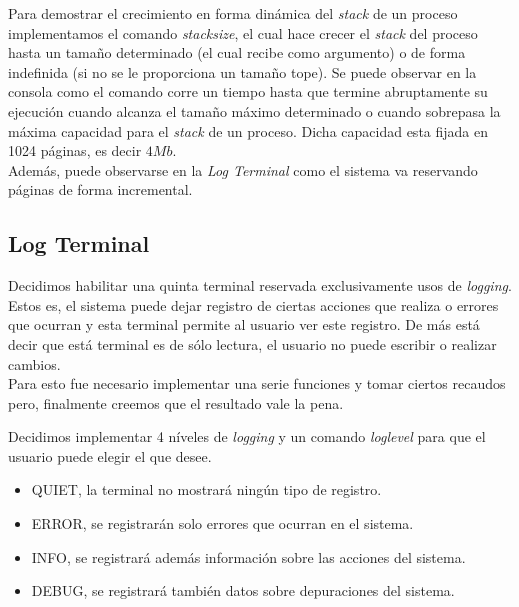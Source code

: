 \documentclass[a4paper,10pt]{article}
\begin{document}
        Para demostrar el crecimiento en forma dinámica del \textit{stack} de un proceso implementamos el comando \textit{stacksize}, el cual hace crecer el 
        \textit{stack} del proceso hasta un tamaño determinado (el cual recibe como argumento) o de forma indefinida (si no se le proporciona un tamaño tope).
        Se puede observar en la consola como el comando corre un tiempo hasta que termine abruptamente su ejecución cuando alcanza el tamaño máximo determinado 
        o cuando sobrepasa la máxima capacidad para el \textit{stack} de un proceso. Dicha capacidad esta fijada en 1024 páginas, es decir $4 Mb$.\\

        Además, puede observarse en la \textit{Log Terminal} como el sistema va reservando páginas de forma incremental.

        \subsection{Log Terminal}

        Decidimos habilitar una quinta terminal reservada exclusivamente usos de \textit{logging}. 
        Estos es, el sistema puede dejar registro de ciertas acciones que realiza o errores que ocurran y esta terminal permite al usuario ver este registro. De más
        está decir que está terminal es de sólo lectura, el usuario no puede escribir o realizar cambios.\\

        Para esto fue necesario implementar una serie funciones y tomar ciertos recaudos pero, finalmente creemos que el resultado vale la pena.

        Decidimos implementar 4 níveles de \textit{logging} y un comando \textit{loglevel} para que el usuario puede elegir el que desee.\\

        \begin{itemize}
        \item QUIET, la terminal no mostrará ningún tipo de registro.
        \item ERROR, se registrarán solo errores que ocurran en el sistema.
        \item INFO, se registrará además información sobre las acciones del sistema.
        \item DEBUG, se registrará también datos sobre depuraciones del sistema.
        \end{itemize}
\end{document}
